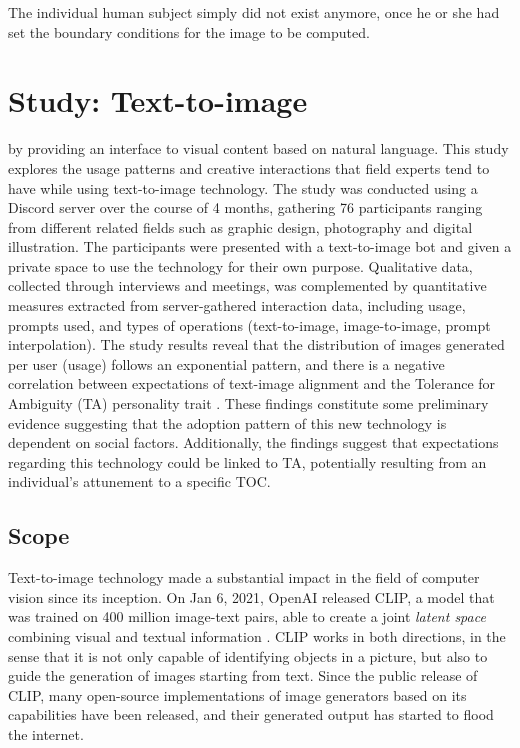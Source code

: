 \begin{savequote}[75mm]
The individual human subject simply did not exist anymore, once he or she had set the boundary conditions for the image to be computed. 
\end{savequote}

\chapter{Study: Text-to-image}

 by providing an interface to visual content based on natural language. This study explores the usage patterns and creative interactions that field experts tend to have while using text-to-image technology. The study was conducted using a Discord server over the course of 4 months, gathering 76 participants ranging from different related fields such as graphic design, photography and digital illustration. The participants were presented with a text-to-image bot and given a private space to use the technology for their own purpose. Qualitative data, collected through interviews and meetings, was complemented by quantitative measures extracted from server-gathered interaction data, including usage, prompts used, and types of operations (text-to-image, image-to-image, prompt interpolation). The study results reveal that the distribution of images generated per user (usage) follows an exponential pattern, and there is a negative correlation between expectations of text-image alignment and the Tolerance for Ambiguity (TA) personality trait \citep{Norton1975,Furnham2013,ZENASNI2008,Herman2010,}. These findings constitute some preliminary evidence suggesting that the adoption pattern of this new technology is dependent on social factors. Additionally, the findings suggest that expectations regarding this technology could be linked to TA, potentially resulting from an individual's attunement to a specific TOC.

\section{Scope}

Text-to-image technology made a substantial impact in the field of computer vision since its inception. On Jan 6, 2021, OpenAI released CLIP, a model that was trained on 400 million image-text pairs, able to create a joint \emph{latent space} combining visual and textual information \citep{Radford2021}. CLIP works in both directions, in the sense that it is not only capable of identifying objects in a picture, but also to guide the generation of images starting from text. Since the public release of CLIP, many open-source implementations of image generators based on its capabilities have been released, and their generated output has started to flood the internet.

